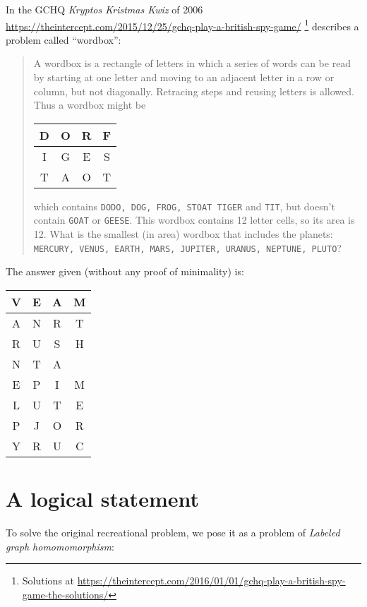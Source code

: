 \documentclass{article}
\begin{document}
In the GCHQ \emph{Kryptos Kristmas Kwiz} of 2006
\url{https://theintercept.com/2015/12/25/gchq-play-a-british-spy-game/}
\footnote{Solutions at \url{https://theintercept.com/2016/01/01/gchq-play-a-british-spy-game-the-solutions/}}
describes a problem called ``wordbox'':
\begin{quotation}
  A wordbox is a rectangle of letters in which a series of words can
  be read by starting at one letter and moving to an adjacent letter
  in a row or column, but not diagonally. Retracing steps and reusing
  letters is allowed.  Thus a wordbox might be
  \begin{center}
    \begin{tabular}[h]{|c|c|c|c|}
      \hline
       D & O & R & F \\
      \hline
       I & G & E & S \\
      \hline
       T & A & O & T \\
      \hline
    \end{tabular}
  \end{center}
  which contains {\tt DODO, DOG, FROG, STOAT TIGER} and {\tt TIT}, but
doesn't contain {\tt GOAT} or {\tt GEESE}. This wordbox contains 12
letter cells, so its area is 12.  What is the smallest (in area)
wordbox that includes the planets: {\tt MERCURY, VENUS, EARTH, MARS,
  JUPITER, URANUS, NEPTUNE, PLUTO}?
\end{quotation}
The answer given (without any proof of minimality) is:
\begin{center}
  \begin{tabular}[h]{|c|c|c|c|}
    \hline
    V & E & A & M \\
    \hline
    A & N & R & T \\
    \hline
    R & U & S & H \\
    \hline
    N & T & A & \quad \\
    \hline
    E & P & I & M \\
    \hline
    L & U & T & E \\
    \hline
    P & J & O & R \\
    \hline
    Y & R & U & C \\
    \hline
  \end{tabular}
\end{center}
\section{A logical statement}
\label{sec:logical-statement}

To solve the original recreational problem, we pose it as a problem of
\emph{Labeled graph homomomorphism}:
\end{document}
